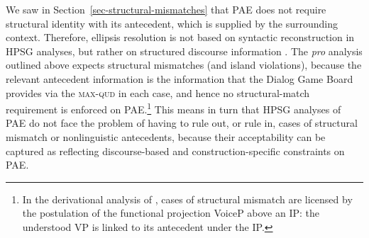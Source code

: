 We saw in Section~\ref{sec-structural-mismatches} that PAE does not require structural identity with its antecedent, which is supplied by the surrounding context. Therefore, ellipsis resolution is not based on syntactic reconstruction in HPSG analyses, but rather on structured discourse information \citep[see][295]{Ginzburg:Sag:2000}. %
%
The \emph{pro} analysis outlined above expects structural mismatches (and island violations), %
%
because the relevant antecedent information is the information that the Dialog Game Board provides via the \textsc{max-qud} in each case, and hence no structural-match requirement is enforced on PAE.\footnote{In the derivational
analysis of \citet{Merchant2013}, cases of structural mismatch are licensed by
the postulation of the functional projection VoiceP above an IP: the understood
VP is linked to its antecedent under the IP.} This means in turn that HPSG analyses of PAE do not face the problem of having to rule out, or rule in, cases of structural mismatch or nonlinguistic antecedents, because their acceptability can be captured as reflecting discourse-based and construction-specific constraints on PAE.




